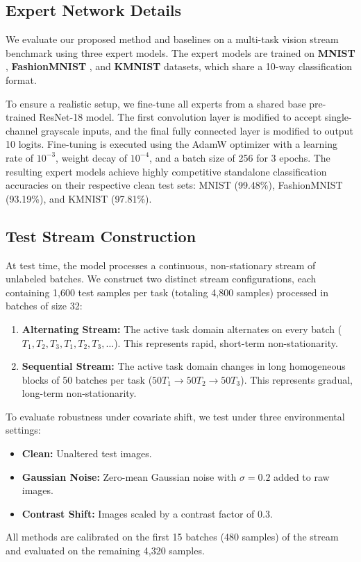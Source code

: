 \documentclass{article}
\theoremstyle{plain}
\theoremstyle{definition}
\theoremstyle{remark}
\begin{document}
\subsection{Expert Network Details}
We evaluate our proposed method and baselines on a multi-task vision stream benchmark using three expert models. The expert models are trained on \textbf{MNIST} \cite{lecun1998gradient}, \textbf{FashionMNIST} \cite{xiao2017fashion}, and \textbf{KMNIST} \cite{clanuwat2018deep} datasets, which share a 10-way classification format. 

To ensure a realistic setup, we fine-tune all experts from a shared base pre-trained ResNet-18 model. The first convolution layer is modified to accept single-channel grayscale inputs, and the final fully connected layer is modified to output 10 logits. Fine-tuning is executed using the AdamW optimizer with a learning rate of $10^{-3}$, weight decay of $10^{-4}$, and a batch size of 256 for 3 epochs. The resulting expert models achieve highly competitive standalone classification accuracies on their respective clean test sets: MNIST (99.48\%), FashionMNIST (93.19\%), and KMNIST (97.81\%).

\subsection{Test Stream Construction}
At test time, the model processes a continuous, non-stationary stream of unlabeled batches. We construct two distinct stream configurations, each containing 1,600 test samples per task (totaling 4,800 samples) processed in batches of size 32:
\begin{enumerate}
    \item \textbf{Alternating Stream:} The active task domain alternates on every batch ($T_1, T_2, T_3, T_1, T_2, T_3, \dots$). This represents rapid, short-term non-stationarity.
    \item \textbf{Sequential Stream:} The active task domain changes in long homogeneous blocks of 50 batches per task ($50 T_1 \to 50 T_2 \to 50 T_3$). This represents gradual, long-term non-stationarity.
\end{enumerate}

To evaluate robustness under covariate shift, we test under three environmental settings:
\begin{itemize}
    \item \textbf{Clean:} Unaltered test images.
    \item \textbf{Gaussian Noise:} Zero-mean Gaussian noise with $\sigma=0.2$ added to raw images.
    \item \textbf{Contrast Shift:} Images scaled by a contrast factor of 0.3.
\end{itemize}
All methods are calibrated on the first 15 batches (480 samples) of the stream and evaluated on the remaining 4,320 samples.
\end{document}
